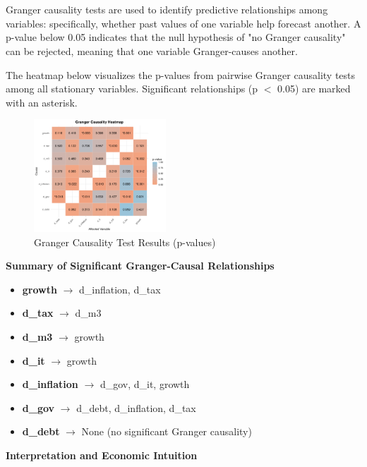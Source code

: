 \documentclass[a4paper,12pt]{article}
\begin{document}
\section{}

Granger causality tests are used to identify predictive relationships among variables: specifically, whether past values of one variable help forecast another. A p-value below 0.05 indicates that the null hypothesis of "no Granger causality" can be rejected, meaning that one variable Granger-causes another.

The heatmap below visualizes the p-values from pairwise Granger causality tests among all stationary variables. Significant relationships (p $<$ 0.05) are marked with an asterisk.

\begin{figure}[H]
  \centering
  \includegraphics[width=0.44\textwidth]{../results/granger_causality_heatmap.png}
  \caption{Granger Causality Test Results (p-values)}
\end{figure}

\textbf{Summary of Significant Granger-Causal Relationships}

\begin{itemize}
  \item \textbf{growth} $\rightarrow$ d\_inflation, d\_tax
  \item \textbf{d\_tax} $\rightarrow$ d\_m3
  \item \textbf{d\_m3} $\rightarrow$ growth
  \item \textbf{d\_it} $\rightarrow$ growth
  \item \textbf{d\_inflation} $\rightarrow$ d\_gov, d\_it, growth
  \item \textbf{d\_gov} $\rightarrow$ d\_debt, d\_inflation, d\_tax
  \item \textbf{d\_debt} $\rightarrow$ None (no significant Granger causality)
\end{itemize}

\textbf{Interpretation and Economic Intuition}
\end{document}
